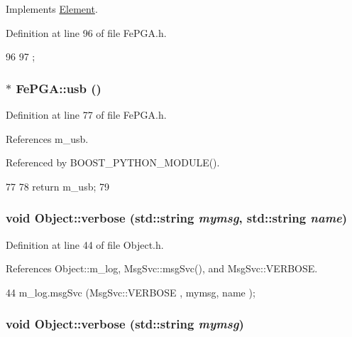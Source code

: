 Implements \hyperlink{classElement_a4e6c83efae95616ebddd03c793a26661}{Element}.

Definition at line 96 of file FePGA.h.


\begin{DoxyCode}
96                  {
97   };
\end{DoxyCode}
\hypertarget{classFePGA_a4a7889dc3c2f88f623876ca475e66410}{
\subsubsection[{usb}]{$\ast$ FePGA::usb ()}}
\label{classFePGA_a4a7889dc3c2f88f623876ca475e66410}


Definition at line 77 of file FePGA.h.

References m\_\-usb.

Referenced by BOOST\_\-PYTHON\_\-MODULE().


\begin{DoxyCode}
77                          {
78     return m_usb;
79   }
\end{DoxyCode}
\hypertarget{classObject_a2d4120195317e2a3c6532e8bb9f3da68}{
\subsubsection[{verbose}]{\setlength{\rightskip}{0pt plus 5cm}void Object::verbose (std::string {\em mymsg}, \/  std::string {\em name})}}
\label{classObject_a2d4120195317e2a3c6532e8bb9f3da68}


Definition at line 44 of file Object.h.

References Object::m\_\-log, MsgSvc::msgSvc(), and MsgSvc::VERBOSE.


\begin{DoxyCode}
44 { m_log.msgSvc (MsgSvc::VERBOSE , mymsg, name ); }
\end{DoxyCode}
\hypertarget{classObject_a83d2db2df682907ea1115ad721c1c4a1}{
\subsubsection[{verbose}]{\setlength{\rightskip}{0pt plus 5cm}void Object::verbose (std::string {\em mymsg})}}
\label{classObject_a83d2db2df682907ea1115ad721c1c4a1}


